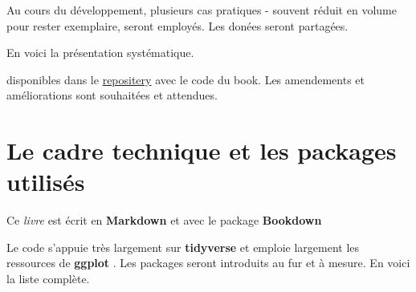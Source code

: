 \documentclass[
]{book}
\begin{document}
Au cours du développement, plusieurs cas pratiques - souvent réduit en volume pour rester exemplaire, seront employés. Les donées seront partagées.

En voici la présentation systématique.

disponibles dans le \href{https://benaventc.github.io//}{repositery} avec le code du book. Les amendements et améliorations sont souhaitées et attendues.

\hypertarget{le-cadre-technique-et-les-packages-utilisuxe9s}{%
\section{Le cadre technique et les packages utilisés}\label{le-cadre-technique-et-les-packages-utilisuxe9s}}

Ce \emph{livre} est écrit en \textbf{Markdown} \citep{allaire_rmarkdown_2021} et avec le package \textbf{Bookdown} \citep{R-bookdown}

Le code s'appuie très largement sur \textbf{tidyverse} et emploie largement les ressources de \textbf{ggplot} . Les packages seront introduits au fur et à mesure. En voici la liste complète.
\end{document}
